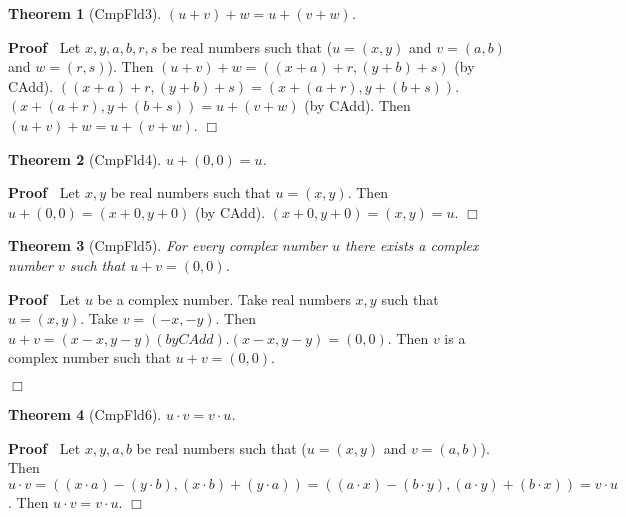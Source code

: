 \documentclass{article}
\newenvironment{forthel}{\begin{leftbar}}{\end{leftbar}}
\newenvironment{proof}{\noindent\textbf{Proof\ }}{\hspace*{\fill}$\Box$\medskip}
\newtheorem{theorem}{Theorem}
\newcommand{\cmul}{\cdot}
\newcommand{\cadd}{+}
\begin{document}
\begin{forthel}
\begin{theorem}[CmpFld3] $(u  \cadd  v)  \cadd  w = u  \cadd  (v  \cadd  w)$.
\end{theorem}
\begin{proof} 
Let $x,y,a,b,r,s$ be real numbers such that ($u = (x,y)$ and $v = (a,b)$ and $w = (r,s)$).\newline
Then $(u  \cadd  v)  \cadd  w = ((x+a)+r, (y+b)+s)$ (by CAdd). \newline
$((x+a)+r, (y+b)+s)= (x+(a+r), y+(b+s))$.\newline
$(x+(a+r), y+(b+s)) = u  \cadd  (v  \cadd  w)$ (by CAdd).\newline
Then $(u \cadd v) \cadd w=u \cadd (v \cadd w)$. 
\end{proof}


\begin{theorem}[CmpFld4] $u  \cadd  (0,0) = u$.
\end{theorem}\begin{proof} 
Let $x,y$ be real numbers such that $u = (x,y)$. Then $u  \cadd  (0,0) = (x+0,y+0)$ (by CAdd).\newline
 $(x+0,y+0) = (x,y) = u$. 
\end{proof}




\begin{theorem}[CmpFld5] For every complex number $u$ there exists a complex number $v$ such that $u  \cadd  v = (0,0)$.
\end{theorem}\begin{proof}
 Let $u$ be a complex number.\newline
Take real numbers $x,y$ such that $u = (x,y)$. Take $v = (-x, -y)$.\newline
 Then  $u  \cadd  v = (x-x, y-y)(by CAdd) . (x-x, y-y) = (0,0)$. \newline
Then $v$ is a complex number such that $u \cadd v = (0,0)$.

\end{proof}


\begin{theorem}[CmpFld6] $u \cmul v = v \cmul u$.
\end{theorem}
\begin{proof}
 Let $x,y,a,b$ be real numbers such that ($u = (x,y)$ and $v = (a,b)$).\newline
Then $u \cmul v =  ((x \cdot a) - (y \cdot b), (x \cdot b) + (y \cdot a)) =  ((a \cdot x) - (b \cdot y), (a \cdot y) + (b \cdot x)) = v \cmul u$.\newline
Then $u \cmul v = v \cmul u$. 
 \end{proof}



\end{forthel}
\end{document}
